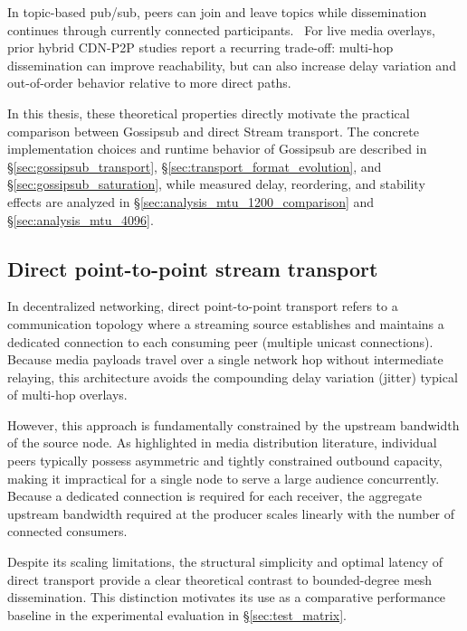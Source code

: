 In topic-based pub/sub, peers can join and leave topics while dissemination continues through currently connected participants.~\cite{WhatPublishSubscribe,SpecsPubsubGossipsub} For live media overlays, prior hybrid \ac{CDN}-\ac{P2P} studies report a recurring trade-off: multi-hop dissemination can improve reachability, but can also increase delay variation and out-of-order behavior relative to more direct paths.

In this thesis, these theoretical properties directly motivate the practical comparison between Gossipsub and direct Stream transport. The concrete implementation choices and runtime behavior of Gossipsub are described in \S\ref{sec:gossipsub_transport}, \S\ref{sec:transport_format_evolution}, and \S\ref{sec:gossipsub_saturation}, while measured delay, reordering, and stability effects are analyzed in \S\ref{sec:analysis_mtu_1200_comparison} and \S\ref{sec:analysis_mtu_4096}.

\subsection{Direct point-to-point stream transport}
In decentralized networking, direct point-to-point transport refers to a communication topology where a streaming source establishes and maintains a dedicated connection to each consuming peer (multiple unicast connections). Because media payloads travel over a single network hop without intermediate relaying, this architecture avoids the compounding delay variation (jitter) typical of multi-hop overlays.~\cite{apostolopoulosVideoStreamingConcepts}

However, this approach is fundamentally constrained by the upstream bandwidth of the source node. As highlighted in media distribution literature, individual peers typically possess asymmetric and tightly constrained outbound capacity, making it impractical for a single node to serve a large audience concurrently.~\cite{xuAnalysisCDNP2P2006} Because a dedicated connection is required for each receiver, the aggregate upstream bandwidth required at the producer scales linearly with the number of connected consumers.~\cite{apostolopoulosVideoStreamingConcepts} 

Despite its scaling limitations, the structural simplicity and optimal latency of direct transport provide a clear theoretical contrast to bounded-degree mesh dissemination. This distinction motivates its use as a comparative performance baseline in the experimental evaluation in \S\ref{sec:test_matrix}.

